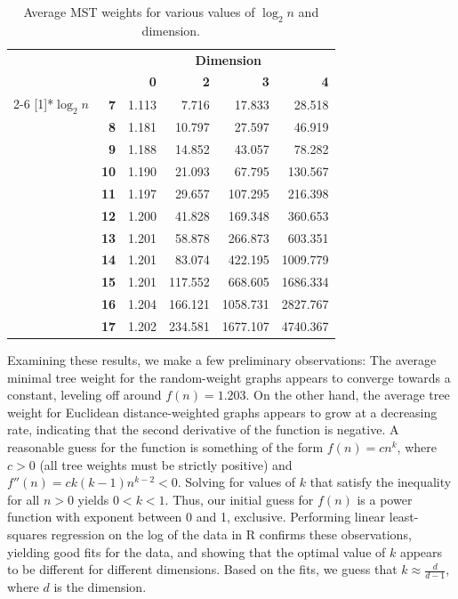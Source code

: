 \documentclass[a4paper]{article}
\begin{document}
\begin{table}[htbp]
  \centering
    \begin{tabular}{cr|rrrr}
          & \multicolumn{1}{r}{} & \multicolumn{4}{c}{\textbf{Dimension}} \\
          &       & \textbf{0} & \textbf{2} & \textbf{3} & \textbf{4} \\
\cmidrule{2-6}    \multirow{11}[1]{*}{\textbf{$\log_2n$}} & \textbf{7} & 1.113 & 7.716 & 17.833 & 28.518 \\
          & \textbf{8} & 1.181 & 10.797 & 27.597 & 46.919 \\
          & \textbf{9} & 1.188 & 14.852 & 43.057 & 78.282 \\
          & \textbf{10} & 1.190 & 21.093 & 67.795 & 130.567 \\
          & \textbf{11} & 1.197 & 29.657 & 107.295 & 216.398 \\
          & \textbf{12} & 1.200 & 41.828 & 169.348 & 360.653 \\
          & \textbf{13} & 1.201 & 58.878 & 266.873 & 603.351 \\
          & \textbf{14} & 1.201 & 83.074 & 422.195 & 1009.779 \\
          & \textbf{15} & 1.201 & 117.552 & 668.605 & 1686.334 \\
          & \textbf{16} & 1.204 & 166.121 & 1058.731 & 2827.767 \\
          & \textbf{17} & 1.202 & 234.581 & 1677.107 & 4740.367 \\
    \end{tabular}%
  \caption{Average MST weights for various values of $\log_2n$ and dimension.}
  \label{tab:addlabel}%
\end{table}%

Examining these results, we make a few preliminary observations: The average minimal tree weight for the random-weight graphs appears to converge towards a constant, leveling off around $f(n) = 1.203$. On the other hand, the average tree weight for Euclidean distance-weighted graphs appears to grow at a decreasing rate, indicating that the second derivative of the function is negative. A reasonable guess for the function is something of the form $f(n) = cn^k$, where $c>0$ (all tree weights must be strictly positive) and $f''(n) = ck(k-1)n^{k-2} < 0$. Solving for values of $k$ that satisfy the inequality for all $n>0$ yields $0<k<1$. Thus, our initial guess for $f(n)$ is a power function with exponent between 0 and 1, exclusive. Performing linear least-squares regression on the log of the data in R confirms these observations, yielding good fits for the data, and showing that the optimal value of $k$ appears to be different for different dimensions. Based on the fits, we guess that $k\approx \frac{d}{d-1}$, where $d$ is the dimension.
\end{document}
